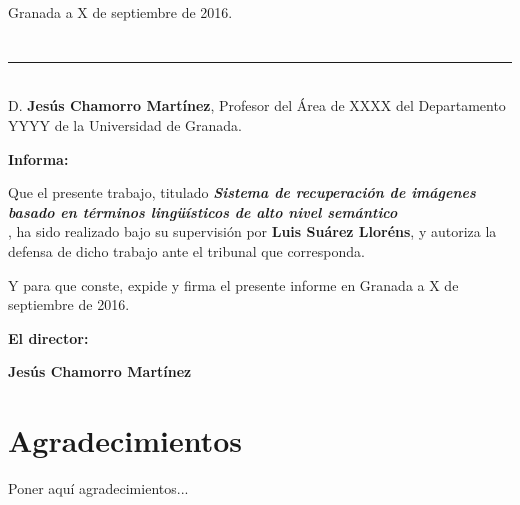 \begin{flushright}
Granada a X de septiembre de 2016.
\end{flushright}


\chapter*{}
\thispagestyle{empty}

\noindent\rule[-1ex]{\textwidth}{2pt}\\[4.5ex]

D. \textbf{Jesús Chamorro Martínez}, Profesor del Área de XXXX del Departamento YYYY de la Universidad de Granada.

\vspace{0.5cm}

\textbf{Informa:}

\vspace{0.5cm}

Que el presente trabajo, titulado \textit{\textbf{Sistema de recuperación de imágenes basado en
términos lingüísticos de alto nivel semántico
\\}},
ha sido realizado bajo su supervisión por \textbf{Luis Suárez Lloréns}, y autoriza la defensa de dicho trabajo ante el tribunal
que corresponda.

\vspace{0.5cm}

Y para que conste, expide y firma el presente informe en Granada a X de septiembre de 2016.

\vspace{1cm}

\textbf{El director:}

\vspace{5cm}

\noindent \textbf{Jesús Chamorro Martínez}

\chapter*{Agradecimientos}
\thispagestyle{empty}

       \vspace{1cm}


Poner aquí agradecimientos...

